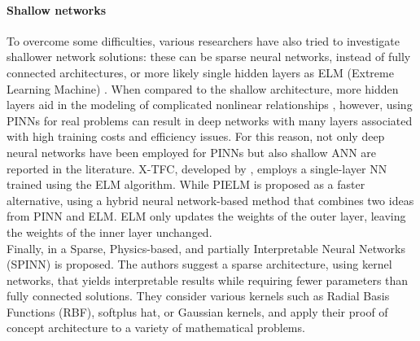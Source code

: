 \documentclass[pdflatex,sn-basic]{sn-jnl}%
\theoremstyle{thmstyleone}%
\theoremstyle{thmstyletwo}%
\theoremstyle{thmstylethree}%
\begin{document}
\paragraph{Shallow networks}
To overcome some difficulties,
various researchers have also tried to investigate shallower network solutions: these can be sparse neural networks, instead of fully connected architectures, or more likely single hidden layers as ELM (Extreme Learning Machine) \citep{Hua2011_ExtremeLearningMachines_WanHWL}.
%
When compared to the shallow architecture, more hidden layers aid in the modeling of complicated nonlinear relationships \citep{Sen2020_ReviewDeepLearning_BasSBS}, however, 
using PINNs for real problems can result in deep networks with many layers associated with high training costs and efficiency issues. For this reason, not only deep neural networks have been employed for PINNs but also shallow ANN are reported in the literature. 
%
X-TFC, developed by \cite{Sch2021_ExtremeTheoryFunctional_FurSFL}, employs a single-layer NN trained using the ELM algorithm. 
%
While PIELM \citep{Dwi2020_PhysicsInformedExtreme_SriDS} is proposed as a faster alternative, using a hybrid neural network-based method that combines two ideas from PINN and ELM. 
ELM only updates the weights of the outer layer, leaving the weights of the inner layer unchanged.%
\\
\noindent
Finally, in \cite{Ram2021_SpinnSparsePhysics_RamRR}
a Sparse, Physics-based, and partially Interpretable Neural Networks (SPINN) is proposed.
The authors suggest a sparse architecture, using kernel networks, that yields interpretable results while requiring fewer parameters than fully connected solutions.
They consider various kernels such as Radial Basis Functions (RBF), softplus hat, or Gaussian kernels, and apply their proof of concept architecture to a variety of mathematical problems.
\end{document}
